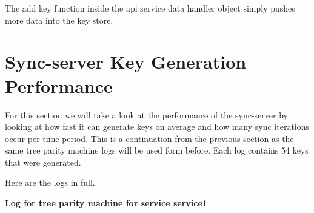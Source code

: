 The add key function inside the api service data handler object simply pushes more data into the key store. 

\section{Sync-server Key Generation Performance}
For this section we will take a look at the performance of the sync-server by looking at how fast it can generate keys on average and how many sync iterations occur per time period. This is a continuation from the previous section as the same tree parity machine logs will be used form before. Each log contains 54 keys that were generated.

Here are the logs in full.

\textbf{Log for tree parity machine for service service1}

